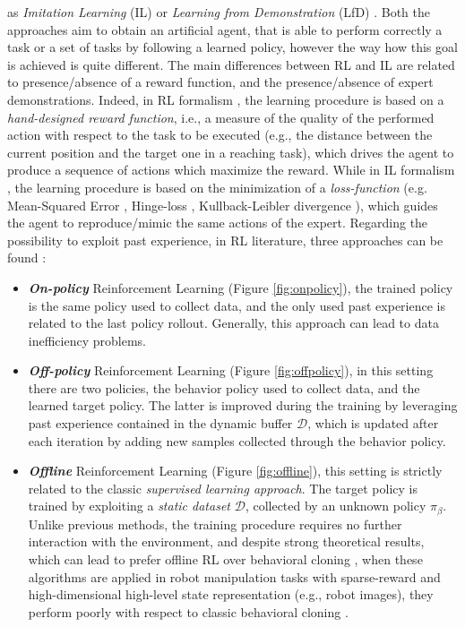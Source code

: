 as \textit{Imitation Learning} (IL) or \textit{Learning from Demonstration} (LfD)
\cite{argall2009robot_learning_from_demonstration}. Both the approaches aim to obtain an artificial agent, that is able to
perform correctly a task or a set of tasks by following a learned policy, however the way how this goal is achieved is
quite different. The main differences between RL and IL are related to presence/absence of a reward function, and the
presence/absence of expert demonstrations. \newline Indeed, in RL formalism \cite{kaelbling1996reinforcement_survey},
the learning procedure is based on a \textit{hand-designed reward function}, i.e., a measure of the quality of the
performed action with respect to the task to be executed (e.g., the distance between the current position and the target
one in a reaching task), which drives the agent to produce a sequence of actions which maximize the reward.
While in IL formalism \cite{osa2018algorithmic}, the learning procedure is based on the minimization of a
\textit{loss-function} (e.g. Mean-Squared Error \cite{james2013introduction_to_sl}, Hinge-loss \cite{cortes1995support},
Kullback-Leibler divergence \cite{kullback1951information}), which guides the agent to reproduce/mimic the same actions
of the expert. \newline Regarding the possibility to exploit past experience, in RL literature, three approaches can be
found \cite{levine202rl_tutorial}:
\begin{itemize}
    \item \textbf{\textit{On-policy}} Reinforcement Learning (Figure \ref{fig:onpolicy}), the trained policy is the same
          policy used to collect data, and the only used past experience is related to the last policy rollout. Generally, this approach can lead to data inefficiency problems.
    \item \textbf{\textit{Off-policy}} Reinforcement Learning (Figure \ref{fig:offpolicy}), in this setting there are two policies, the behavior policy used to collect data, and the learned target policy. The latter is improved during the training by leveraging past experience contained in the dynamic buffer $\mathcal{D}$, which is updated after each iteration by adding new samples collected through the behavior policy.
    \item \textbf{\textit{Offline}} Reinforcement Learning (Figure \ref{fig:offline}), this setting is strictly related to the
          classic \textit{supervised learning approach}. The target policy is trained by exploiting a \textit{static dataset} $\mathcal{D}$,
          collected by an unknown policy $\pi_{\beta}$. Unlike previous methods, the training procedure requires no further interaction with the environment, and despite strong theoretical results, which can lead to prefer offline RL over behavioral cloning \cite{kumar2021orl_vs_bc}, when these algorithms are applied in robot manipulation tasks with sparse-reward and high-dimensional high-level state representation (e.g., robot images), they perform poorly with respect to classic behavioral cloning \cite{mandlekar2022matters}.
\end{itemize}
